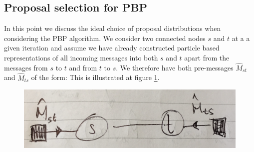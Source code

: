 \subsection{Proposal selection for PBP}
In this point we discuss the ideal choice of proposal distributions when considering the PBP algorithm. We consider two connected nodes $s$ and $t$ at a a given iteration and assume we have already constructed particle based representations of all incoming messages into both $s$ and $t$ apart from the messages from $s$ to $t$ and from $t$ to $s$. 
We therefore have both pre-messages $\widehat M_{st}$ and $\widehat M_{ts}$ of the form:
%
%
This is illustrated at figure \ref{representation-edge-pbp}. 

\begin{figure}[!h]
\center
\includegraphics[width=.7\textwidth]{figures/draft/schema_pbpsel}
\caption{\label{representation-edge-pbp}}
\end{figure}

